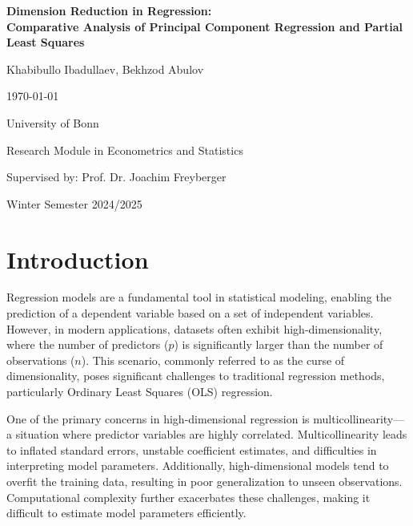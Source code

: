 \documentclass[11pt,twoside,a4paper]{article}
\begin{document}
\begin{titlepage}
  \centering
  {\LARGE\bfseries Dimension Reduction in Regression: \\ Comparative Analysis of Principal Component Regression and Partial Least Squares\par}
  \vfill
  {\Large Khabibullo Ibadullaev, Bekhzod Abulov\par}
  \vfill
  {\large \today\par}
  \vfill
  {\large University of Bonn\par}
  {\large Research Module in Econometrics and Statistics\par}
  {\large Supervised by: Prof. Dr. Joachim Freyberger\par}
  \vfill
  {\large Winter Semester 2024/2025\par}
\end{titlepage}

\newpage

\thispagestyle{empty}
\tableofcontents

\newpage

\setlength{\abovedisplayskip}{0.35cm}
\setlength{\belowdisplayskip}{0.35cm}

\setlength{\abovedisplayshortskip}{0.2cm}
\setlength{\belowdisplayshortskip}{0.35cm}
\setlength{\parskip}{0.5em}

\section{Introduction}

Regression models are a fundamental tool in statistical modeling, enabling the prediction of a dependent variable based on a set of independent variables. However, in modern applications, datasets often exhibit high-dimensionality, where the number of predictors (\( p \)) is significantly larger than the number of observations (\( n \)). This scenario, commonly referred to as the curse of dimensionality, poses significant challenges to traditional regression methods, particularly Ordinary Least Squares (OLS) regression.

One of the primary concerns in high-dimensional regression is multicollinearity—a situation where predictor variables are highly correlated. Multicollinearity leads to inflated standard errors, unstable coefficient estimates, and difficulties in interpreting model parameters. Additionally, high-dimensional models tend to overfit the training data, resulting in poor generalization to unseen observations. Computational complexity further exacerbates these challenges, making it difficult to estimate model parameters efficiently.
\end{document}
